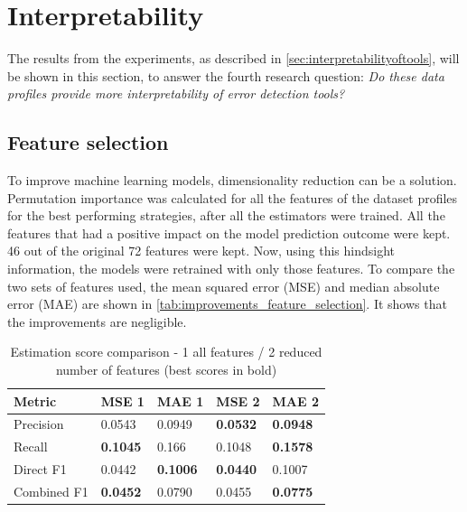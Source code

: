 \newpage
\section{Interpretability}
\label{sec:results_interpretability}
The results from the experiments, as described in \autoref{sec:interpretabilityoftools}, will be shown in this section, to answer the fourth research question: \textit{Do these data profiles provide more interpretability of error detection tools?}

\subsection{Feature selection}
\label{subsec:interpretability_results_feature_selection}
To improve machine learning models, dimensionality reduction can be a solution. Permutation importance was calculated for all the features of the dataset profiles for the best performing strategies, after all the estimators were trained. All the features that had a positive impact on the model prediction outcome were kept. 46 out of the original 72 features were kept. Now, using this hindsight information, the models were retrained with only those features. To compare the two sets of features used, the mean squared error (MSE) and median absolute error (MAE) are shown in \autoref{tab:improvements_feature_selection}. It shows that the improvements are negligible.

\begin{table}[h]
\centering
\begin{tabular}{l|ll|ll}
\textbf{Metric} & \textbf{MSE 1} & \textbf{MAE 1} & \textbf{MSE 2} & \textbf{MAE 2} \\ \hline
Precision       & 0.0543         & 0.0949         & \textbf{0.0532}         & \textbf{0.0948}         \\
Recall          & \textbf{0.1045}         & 0.166          & 0.1048         & \textbf{0.1578}         \\
Direct F1       & 0.0442         & \textbf{0.1006}         & \textbf{0.0440}         & 0.1007         \\
Combined F1     & \textbf{0.0452}         & 0.0790         & 0.0455         & \textbf{0.0775}        
\end{tabular}
\caption{Estimation score comparison - 1 all features / 2 reduced number of features (best scores in bold)}
\label{tab:improvements_feature_selection}
\end{table}


